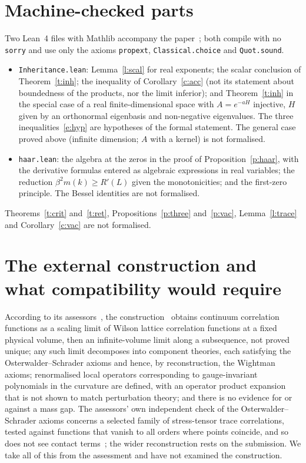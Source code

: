 \section{Machine-checked parts}\label{s:lean}
Two Lean~4 files with Mathlib accompany the paper~\cite{RepoLean}; both compile with no \texttt{sorry} and use
only the axioms \texttt{propext}, \texttt{Classical.choice} and \texttt{Quot.sound}.
\begin{itemize}
\item \texttt{Inheritance.lean}: Lemma~\ref{l:scal} for real exponents; the scalar conclusion of
Theorem~\ref{t:inh}; the inequality of Corollary~\ref{c:acc} (not its statement about boundedness of the
products, nor the limit inferior); and Theorem~\ref{t:inh} in the special case of a real finite-dimensional
space with $A=e^{-aH}$ injective, $H$ given by an orthonormal eigenbasis and non-negative eigenvalues. The
three inequalities~\eqref{e:hyp} are hypotheses of the formal statement. The general case proved above
(infinite dimension; $A$ with a kernel) is not formalised.
\item \texttt{haar.lean}: the algebra at the zeros in the proof of Proposition~\ref{p:haar}, with the
derivative formulas entered as algebraic expressions in real variables; the reduction
$\beta^2m(k)\ge R'(L)$ given the monotonicities; and the first-zero principle. The Bessel identities are not
formalised.
\end{itemize}
Theorems~\ref{t:crit} and~\ref{t:ret}, Propositions~\ref{p:three} and~\ref{p:vac}, Lemma~\ref{l:trace} and
Corollary~\ref{c:vac} are not formalised.

\section{The external construction and what compatibility would require}\label{s:ext}
According to its assessors~\cite[pp.~1, 3]{YMG}, the construction~\cite{OAI} obtains continuum correlation
functions as a scaling limit of Wilson lattice correlation functions at a fixed physical volume, then an
infinite-volume limit along a subsequence, not proved unique; any such limit decomposes into component
theories, each satisfying the Osterwalder--Schrader axioms and hence, by reconstruction, the Wightman axioms;
renormalised local operators corresponding to gauge-invariant polynomials in the curvature are defined, with
an operator product expansion that is not shown to match perturbation theory; and there is no evidence for or
against a mass gap. The assessors' own independent check of the Osterwalder--Schrader axioms concerns a
selected family of stress-tensor trace correlations, tested against functions that vanish to all orders where
points coincide, and so does not see contact terms~\cite[Part~II]{YMG}; the wider reconstruction rests on
the submission. We take all of this from the assessment and have not examined the construction.

